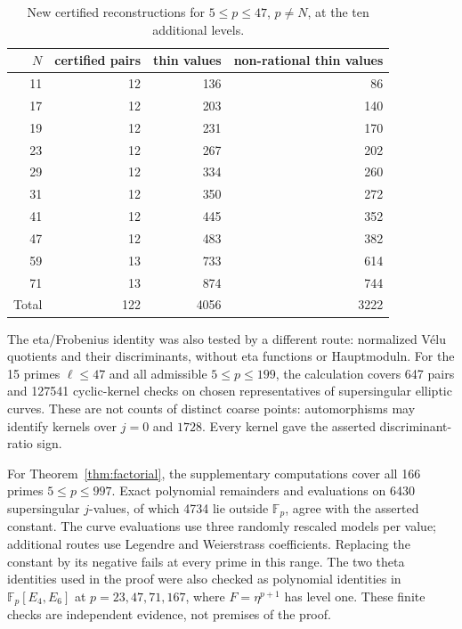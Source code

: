\documentclass[11pt,a4paper]{article}
\numberwithin{equation}{section}
\theoremstyle{definition}
\theoremstyle{remark}
\newcommand{\Fp}{\mathbb F_p}
\begin{document}
\begin{table}[htbp]\centering
\begin{tabular}{rrrr}\toprule
$N$ & certified pairs & thin values & non-rational thin values\\\midrule
11&12&136&86\\
17&12&203&140\\
19&12&231&170\\
23&12&267&202\\
29&12&334&260\\
31&12&350&272\\
41&12&445&352\\
47&12&483&382\\
59&13&733&614\\
71&13&874&744\\\midrule
Total&122&4056&3222\\\bottomrule
\end{tabular}
\caption{New certified reconstructions for $5\le p\le47$, $p\ne N$,
at the ten additional levels.}\label{tab:new-levels}
\end{table}

The eta/Frobenius identity was also tested by a different route: normalized
V\'elu quotients and their discriminants, without eta functions or Hauptmoduln.
For the 15 primes $\ell\le47$ and all admissible $5\le p\le199$, the calculation
covers 647 pairs and 127541 cyclic-kernel checks on chosen representatives of
supersingular elliptic curves. These are not counts of distinct coarse points:
automorphisms may identify kernels over $j=0$ and $1728$.
Every kernel gave the asserted discriminant-ratio sign.

For Theorem~\ref{thm:factorial}, the supplementary computations cover all
166 primes $5\le p\le997$. Exact polynomial remainders and evaluations
on 6430 supersingular $j$-values, of which 4734 lie outside $\Fp$, agree
with the asserted constant. The curve evaluations use three randomly
rescaled models per value; additional routes use Legendre and Weierstrass
coefficients. Replacing the constant by its negative fails at every prime
in this range. The two theta identities used in the proof were also
checked as polynomial identities in $\Fp[E_4,E_6]$ at
$p=23,47,71,167$, where $F=\eta^{p+1}$ has level one.
These finite checks are independent evidence, not premises of the proof.
\end{document}
